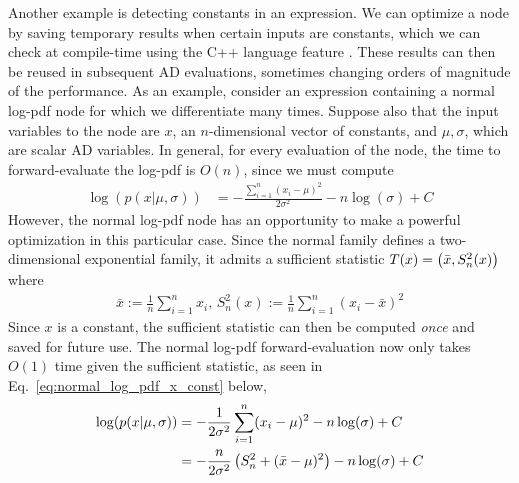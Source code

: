 Another example is detecting constants in an expression. 
We can optimize a node by saving temporary results when certain inputs are constants,
which we can check at compile-time using the C++ language feature .
These results can then be reused in subsequent AD evaluations,
sometimes changing orders of magnitude of the performance.
As an example, consider an expression containing a normal log-pdf node for which we differentiate many times.
Suppose also that the input variables to the node are $x$, an $n$-dimensional vector of constants,
and $\mu, \sigma$, which are scalar AD variables.
In general, for every evaluation of the node, the time to forward-evaluate the log-pdf is $O(n)$,
since we must compute 
\begin{align*}
    \log(p(x|\mu, \sigma)) &= -\frac{\sum\limits_{i=1}^n (x_i-\mu)^2}{2\sigma^2} - n\log(\sigma) + C
\end{align*}
However, the normal log-pdf node has an opportunity to make a powerful optimization in this particular case.
Since the normal family defines a two-dimensional exponential family,
it admits a sufficient statistic $T(x) = \left(\bar{x}, S^2_n(x)\right)$ where
\begin{align*}
    \bar{x} := \frac{1}{n} \sum\limits_{i=1}^n x_i, \,
    S_n^2(x) := \frac{1}{n} \sum\limits_{i=1}^n (x_i - \bar{x})^2
\end{align*}
Since $x$ is a constant, the sufficient statistic can then be computed \emph{once} and saved for future use.
The normal log-pdf forward-evaluation now only takes $O(1)$ time given the sufficient statistic,
as seen in Eq.~\ref{eq:normal_log_pdf_x_const} below,
\begin{align}
    \log(p(x|\mu, \sigma)) 
    &= -\frac{1}{2 \sigma^2} 
        \sum\limits_{i=1}^n (x_i - \mu)^2 
        - n\log(\sigma) + C \nonumber \\
    &= -\frac{n}{2 \sigma^2} 
        \left(S_n^2 + (\bar{x} - \mu)^2\right) 
        - n\log(\sigma) + C 
        \label{eq:normal_log_pdf_x_const}
\end{align}
